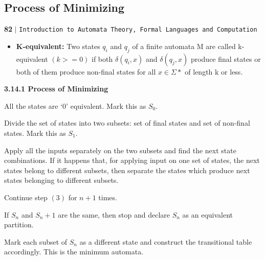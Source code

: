 \documentclass[a4,9pt]{beamer}
\begin{document}
\begin{frame}
\section*{Process of Minimizing}
\begin{flushleft}
    \textbf{82}\hspace*{0.1cm} \textbf{$|$} \hspace*{0.1cm} \texttt{Introduction to Automata Theory, Formal Languages and Computation}
  \end{flushleft}

\begin{itemize}
  \item \textbf{K-equivalent:} Two states $q_i$ and $q_j$ of a finite automata M are called k-equivalent $(k > = 0)$ if both
$\delta(q_i, x)$ and $\delta(q_j, x)$ produce final states or both of them produce non-final states for all $x \in \Sigma*$ of
length k or less.
\end{itemize}
\end{frame}

\begin{frame}
\vspace*{0.3cm}

\LARGE{\textbf{3.14.1 Process of Minimizing}}

\vspace*{0.2cm}

\begin{itemize}
 \small{ \item All the states are ‘0’ equivalent. Mark this as $S_0$.
  \item Divide the set of states into two subsets: set of final states and set of non-final states. Mark this
as $S_1$.
  \item Apply all the inputs separately on the two subsets and find the next state combinations. If it happens
that, for applying input on one set of states, the next states belong to different subsets, then
separate the states which produce next states belonging to different subsets.
  \item Continue step $(3)$ for $n + 1$ times.
  \item If $S_n$ and $S_n + 1$ are the same, then stop and declare $S_n$ as an equivalent partition.
  \item Mark each subset of $S_n$ as a different state and construct the transitional table accordingly. This is
the minimum automata.}
\end{itemize}
\end{frame}
\end{document}
